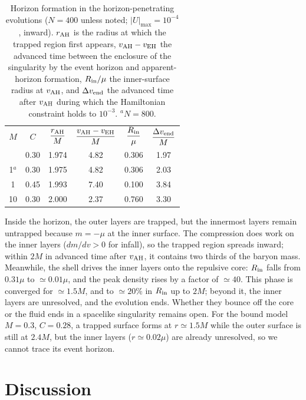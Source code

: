 \documentclass[%
 reprint,
 amsmath,amssymb,
 aps,prd,
 superscriptaddress,
]{revtex4-2}
\begin{document}
\begin{table}[htbp]
\caption{Horizon formation in the horizon-penetrating evolutions ($N=400$ unless noted; $|U|_{\max}=10^{-4}$, inward). $r_{\rm AH}$ is the radius at which the trapped region first appears, $v_{\rm AH}-v_{\rm EH}$ the advanced time between the enclosure of the singularity by the event horizon and apparent-horizon formation, $R_{\rm in}/\mu$ the inner-surface radius at $v_{\rm AH}$, and $\Delta v_{\rm end}$ the advanced time after $v_{\rm AH}$ during which the Hamiltonian constraint holds to $10^{-3}$. $^{a}N=800$.}
\label{tab:horizons}
\setlength{\tabcolsep}{3pt}
\begin{ruledtabular}
\begin{tabular}{cccccc}
$M$ & $C$ & $\dfrac{r_{\rm AH}}{M}$ & $\dfrac{v_{\rm AH}-v_{\rm EH}}{M}$ & $\dfrac{R_{\rm in}}{\mu}$ & $\dfrac{\Delta v_{\rm end}}{M}$\\[6pt]
\colrule
1 & 0.30 & 1.974 & 4.82 & 0.306 & 1.97 \\
1$^{a}$ & 0.30 & 1.975 & 4.82 & 0.306 & 2.03 \\
1 & 0.45 & 1.993 & 7.40 & 0.100 & 3.84 \\
10 & 0.30 & 2.000 & 2.37 & 0.760 & 3.30 \\
\end{tabular}
\end{ruledtabular}
\end{table}

Inside the horizon, the outer layers are trapped, but the innermost layers remain untrapped because $m=-\mu$ at the inner surface. The compression does work on the inner layers ($dm/dv>0$ for infall), so the trapped region spreads inward; within $2M$ in advanced time after $v_{\rm AH}$, it contains two thirds of the baryon mass. Meanwhile, the shell drives the inner layers onto the repulsive core: $R_{\rm in}$ falls from $0.31\mu$ to $\simeq0.01\mu$, and the peak density rises by a factor of $\simeq40$. This phase is converged for $\simeq1.5M$, and to $\simeq20\%$ in $R_{\rm in}$ up to $2M$; beyond it, the inner layers are unresolved, and the evolution ends. Whether they bounce off the core or the fluid ends in a spacelike singularity remains open. For the bound model $M=0.3$, $C=0.28$, a trapped surface forms at $r\simeq1.5M$ while the outer surface is still at $2.4M$, but the inner layers ($r\simeq0.02\mu$) are already unresolved, so we cannot trace its event horizon.

\section{Discussion}
\label{sec:discussion}
\end{document}
